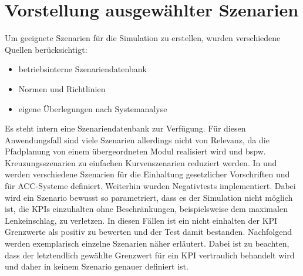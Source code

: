 \chapter{Vorstellung ausgewählter Szenarien} \label{chap:Vorstellung_Szenarien}
\thispagestyle{empty}
Um geeignete Szenarien für die Simulation zu erstellen, wurden verschiedene Quellen berücksichtigt:
\begin{itemize}
    \item betriebsinterne Szenariendatenbank
    \item Normen und Richtlinien 
    \item eigene Überlegungen nach Systemanalyse
\end{itemize}

\noindent Es steht intern eine Szenariendatenbank zur Verfügung. Für diesen Anwendungsfall sind viele Szenarien allerdings nicht von Relevanz, da die Pfadplanung von einem übergeordneten Modul realisiert wird und bspw. Kreuzungsszenarien zu einfachen Kurvenszenarien reduziert werden. In \cite{ISO15622} und \cite{NCAP2024} werden verschiedene Szenarien für die Einhaltung gesetzlicher Vorschriften und für ACC-Systeme definiert. Weiterhin wurden Negativtests implementiert. Dabei wird ein Szenario bewusst so parametriert, dass es der Simulation nicht möglich ist, die KPIs einzuhalten ohne Beschränkungen, beispielsweise dem maximalen Lenkeinschlag, zu verletzen. In diesen Fällen ist ein nicht einhalten der KPI Grenzwerte als positiv zu bewerten und der Test damit bestanden. Nachfolgend werden exemplarisch einzelne Szenarien näher erläutert. Dabei ist zu beachten, dass der letztendlich gewählte Grenzwert für ein KPI vertraulich behandelt wird und daher in keinem Szenario genauer definiert ist.

